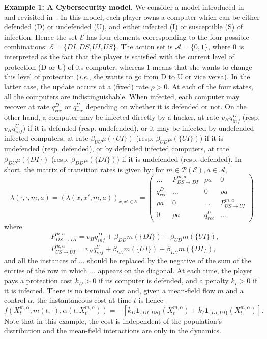 \documentclass{amsproc}
\theoremstyle{definition}
\theoremstyle{remark}
\numberwithin{equation}{section}
\newcommand{\cA}{{\mathcal A}}
\newcommand{\cE}{{\mathcal E}}
\newcommand{\cP}{{\mathcal P}}
\newcommand{\ctrl}{\alpha}
\newcommand{\indic}{\mathbf{1}}
\begin{document}
\textbf{Example 1: A Cybersecurity model. } We consider a model introduced in~\cite{MR3575619} and revisited in~\cite[Section 7.2.3]{MR3752669}. In this model, each player owns a computer which can be either defended (D) or undefended (U), and either infected (I) or susceptible (S) of infection. Hence the set $\cE$ has four elements corresponding to the four possible combinations: $\cE = \{DI, DS, UI, US\}$. The action set is $\cA = \{0,1\}$, where $0$ is interpreted as the fact that the player is satisfied with the current level of protection (D or U) of its computer, whereas $1$ means that she wants to change this level of protection (\textit{i.e.}, she wants to go from D to U or vice versa). In the latter case, the update occurs at a (fixed) rate $\rho >0$. At each of the four states, all the computers are indistinguishable. When infected, each computer may recover at rate $q_{rec}^D$ or $q_{rec}^U$ depending on whether it is defended or not. On the other hand, a computer may be infected directly by a hacker, at rate $v_H q_{inf}^D$ (resp. $v_H q_{inf}^U$) if it is defended (resp. undefended), or it may be infected by undefended infected computers, at rate $\beta_{UU}\mu(\{UI\})$ (resp. $\beta_{UD}\mu(\{UI\})$) if it is undefended (resp. defended), or by defended infected computers, at rate $\beta_{DU}\mu(\{DI\})$ (resp. $\beta_{DD}\mu(\{DI\})$) if it is undefended (resp. defended). In short, the matrix of transition rates is given by: for $m \in \cP(\cE), a \in \cA$, 
$$
	\lambda(\cdot, \cdot, m, a) 
	= \left( \lambda(x, x', m, a) \right)_{x,x' \in \cE}
	= \begin{pmatrix}
	\dots 	& 		P^{m,a}_{DS \rightarrow DI}	&	 \rho a 	&	0
	\\
	q_{rec}^D 	& 	\dots 		&	 0	&	\rho a
	\\
	\rho a 	& 	0 		&	 \dots	&	P^{m,a}_{US \rightarrow UI}
	\\
	0	&	\rho a	&	q_{rec}^U	& \dots
	\end{pmatrix}
$$
where 
\begin{align*}
	&P^{m,a}_{DS \rightarrow DI} = v_H q_{inf}^D + \beta_{DD} m(\{DI\})  + \beta_{UD} m(\{UI\}) ,
	\\
	&P^{m,a}_{US \rightarrow UI} = v_H q_{inf}^U + \beta_{UU} m(\{UI\}) + \beta_{DU} m(\{DI\}),
\end{align*}
and all the instances of $\dots$ should be replaced by the negative of the sum of the entries of the row in which $\dots$ appears on the diagonal. At each time, the player pays a protection cost $k_D>0$ if its computer is defended, and a penalty $k_I>0$ if it is infected. 
There is no terminal cost and, given a mean-field flow $m$ and a control $\ctrl$, the instantaneous cost at time $t$ is hence 
$$
	f(X^{m,\ctrl}_t, m(t,\cdot), \ctrl(t, X^{m,\ctrl}_t)) = -\left[ k_D \indic_{\{DI, DS\}}(X^{m,\ctrl}_t) + k_I \indic_{\{DI, UI\}}(X^{m,\ctrl}_t)\right].
$$
Note that in this example, the cost is independent of the population's distribution and the mean-field interactions are only in the dynamics. 
\end{document}
